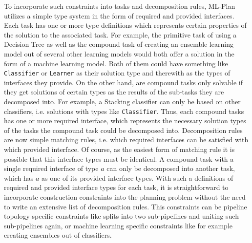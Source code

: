 To incorporate such constraints into tasks and decomposition rules, ML-Plan utilizes a simple type system in the form of required and provided interfaces.
Each task has one or more type definitions which represents certain properties of the solution to the associated task.
For example, the primitive task of using a Decision Tree as well as the compound task of creating an ensemble learning model out of several other learning models would both offer a solution in the form of a machine learning model.
Both of them could have something like \texttt{Classifier} or \texttt{Learner} as their solution type and therewith as the types of interfaces they provide.\newline
On the other hand, are compound tasks only solvable if they get solutions of certain types as the results of the sub-tasks they are decomposed into.
For example, a Stacking classifier can only be based on other classifiers, i.e. solutions with types like \texttt{Classifier}.
Thus, each compound tasks has one or more required interface, which represents the necessary solution types of the tasks the compound task could be decomposed into.\newline
Decomposition rules are now simple matching rules, i.e. which required interfaces can be satisfied with which provided interface.
Of course, as the easiest form of matching rule it is possible that this interface types must be identical.
A compound task with a single required interface of type $a$ can only be decomposed into another task, which has $a$ as one of its provided interface types.
With such a definitions of required and provided interface types for each task, it is straightforward to incorporate construction constraints into the planning problem without the need to write an extensive list of decomposition rules.
This constraints can be pipeline topology specific constraints like splits into two sub-pipelines and uniting such sub-pipelines again, or machine learning specific constraints like for example creating ensembles out of classifiers.

